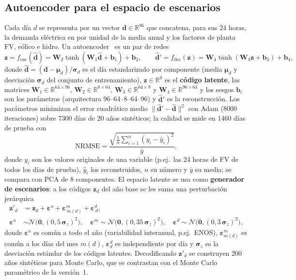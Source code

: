 \documentclass[11pt,a4paper]{article}
\newcommand{\vect}[1]{\bm{#1}}
\begin{document}
\subsection{Autoencoder para el espacio de escenarios}
Cada d\'ia $d$ se representa por un vector $\vect{d}\in\mathbb{R}^{96}$ que concatena,
para sus 24 horas, la demanda el\'ectrica en por unidad de la media anual y los factores
de planta FV, e\'olico e hidro. Un autoencoder~\cite{hinton2006} es un par de redes
\begin{equation}
\vect{z} = f_{\mathrm{enc}}(\hat{\vect{d}}) = \vect{W}_2\tanh(\vect{W}_1\hat{\vect{d}}+\vect{b}_1)+\vect{b}_2,\qquad
\hat{\vect{d}}' = f_{\mathrm{dec}}(\vect{z}) = \vect{W}_4\tanh(\vect{W}_3\vect{z}+\vect{b}_3)+\vect{b}_4,
\label{eq:ae}
\end{equation}
donde $\hat{\vect{d}}=(\vect{d}-\vect{\mu}_d)/\vect{\sigma}_d$ es el d\'ia estandarizado
por componente (media $\vect{\mu}_d$ y desviaci\'on $\vect{\sigma}_d$ del conjunto de
entrenamiento), $\vect{z}\in\mathbb{R}^{8}$ es el \textbf{c\'odigo latente}, las matrices
$\vect{W}_1\in\mathbb{R}^{64\times96}$, $\vect{W}_2\in\mathbb{R}^{8\times64}$,
$\vect{W}_3\in\mathbb{R}^{64\times8}$ y $\vect{W}_4\in\mathbb{R}^{96\times64}$ y los sesgos
$\vect{b}_i$ son los par\'ametros (arquitectura 96--64--8--64--96) y $\hat{\vect{d}}'$ es
la reconstrucci\'on. Los par\'ametros minimizan el error cuadr\'atico medio
$\|\hat{\vect{d}}'-\hat{\vect{d}}\|^2$ con Adam (8000 iteraciones) sobre 7300 d\'ias de
20 a\~nos sint\'eticos; la calidad se mide en 1460 d\'ias de prueba con
\begin{equation}
\mathrm{NRMSE} = \frac{\sqrt{\frac{1}{n}\sum_{i=1}^{n}(y_i-\hat y_i)^2}}{\bar y},
\label{eq:nrmse}
\end{equation}
donde $y_i$ son los valores originales de una variable (p.ej.\ las 24 horas de FV de
todos los d\'ias de prueba), $\hat y_i$ los reconstruidos, $n$ su n\'umero y $\bar y$ su
media; se compara con PCA de 8 componentes. El espacio latente se usa como
\textbf{generador de escenarios}: a los c\'odigos $\vect{z}_d$ del a\~no base se les suma
una perturbaci\'on jer\'arquica
\begin{align}
\vect{z}'_d &= \vect{z}_d + \vect{\varepsilon}^{a} + \vect{\varepsilon}^{m}_{\,m(d)} + \vect{\varepsilon}^{d}_{\,d},
\label{eq:zgen}\\
\vect{\varepsilon}^{a}&\sim\mathcal{N}\big(\vect{0},(0{,}5\,\vect{\sigma}_z)^2\big),\quad
\vect{\varepsilon}^{m}\sim\mathcal{N}\big(\vect{0},(0{,}35\,\vect{\sigma}_z)^2\big),\quad
\vect{\varepsilon}^{d}\sim\mathcal{N}\big(\vect{0},(0{,}3\,\vect{\sigma}_z)^2\big),
\nonumber
\end{align}
donde $\vect{\varepsilon}^{a}$ es com\'un a todo el a\~no (variabilidad interanual, p.ej.\
ENOS), $\vect{\varepsilon}^{m}_{m(d)}$ es com\'un a los d\'ias del mes $m(d)$,
$\vect{\varepsilon}^{d}_d$ es independiente por d\'ia y $\vect{\sigma}_z$ es la desviaci\'on
est\'andar de los c\'odigos latentes. Decodificando $\vect{z}'_d$ se construyen 200 a\~nos
sint\'eticos para Monte Carlo, que se contrastan con el Monte Carlo param\'etrico de la
versi\'on~1.
\end{document}
